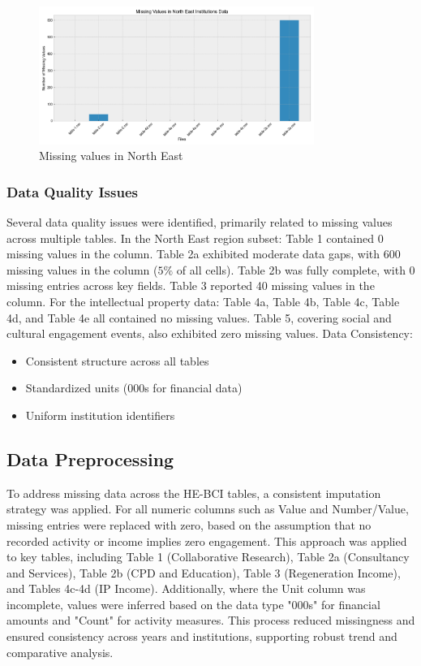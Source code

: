 \documentclass[journal,onecolumn, 10pt,draftclsnofoot]{IEEEtran}
\begin{document}
\begin{figure}[h]
\centering
\includegraphics[width=0.8\textwidth]{Fig/figure1.ne_missing_values.png}
\caption{Missing values in North East}
\label{fig:ne-missing-values}
\end{figure}

\subsubsection{Data Quality Issues}

Several data quality issues were identified, primarily related to missing values across multiple tables. In the North East region subset: Table 1 contained 0 missing values in the column. Table 2a exhibited moderate data gaps, with 600 missing values in the column ($5\%$ of all cells). Table 2b was fully complete, with 0 missing entries across key fields. Table 3 reported 40 missing values in the column. For the intellectual property data: Table 4a, Table 4b, Table 4c, Table 4d, and Table 4e all contained no missing values. Table 5, covering social and cultural engagement events, also exhibited zero missing values. Data Consistency:
\begin{itemize}
    \item Consistent structure across all tables
    \item Standardized units (\textsterling 000s for financial data)
    \item Uniform institution identifiers
\end{itemize}

\subsection{Data Preprocessing}

To address missing data across the HE-BCI tables, a consistent imputation strategy was applied. For all numeric columns such as Value and Number/Value, missing entries were replaced with zero, based on the assumption that no recorded activity or income implies zero engagement. This approach was applied to key tables, including Table 1 (Collaborative Research), Table 2a (Consultancy and Services), Table 2b (CPD and Education), Table 3 (Regeneration Income), and Tables 4c-4d (IP Income). Additionally, where the Unit column was incomplete, values were inferred based on the data type "\textsterling 000s" for financial amounts and "Count" for activity measures. This process reduced missingness and ensured consistency across years and institutions, supporting robust trend and comparative analysis.
\end{document}
